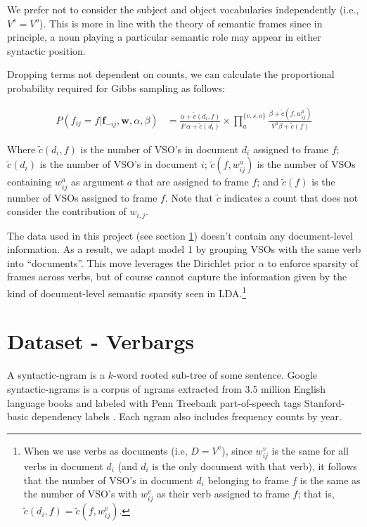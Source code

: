 \documentclass{article} %
\begin{document}
We prefer not to consider the subject and object vocabularies independently 
(i.e., $V^s = V^o$). This is more in line with the theory of semantic frames 
since in principle, a noun playing a particular semantic role may appear in either 
syntactic position.

Dropping terms not dependent on counts, we can calculate the proportional
probability required for Gibbs sampling as follows:

\begin{align}
P(f_{ij} = f|\mathbf{f}_{-ij},\mathbf{w}, \alpha,\beta)
&=\frac{\alpha + \tilde c(d_i,f)}{F\,\alpha + \tilde c(d_i)}
\times \prod_a^{\{v,s,o\}}\frac{\beta+\tilde c(f,w_{ij}^a)}{V^a\beta+\tilde c(f)}
\end{align}

Where $\tilde c (d_i, f)$ is the number of VSO's in document $d_i$ assigned to frame $f$;
$\tilde c(d_i)$ is the number of VSO's in document $i$;
$\tilde c(f,w_{ij}^a)$ is the number of VSOs containing $w_{ij}^a$ as argument $a$ that are
assigned to frame $f$; and
$\tilde c(f)$ is the number of VSOs assigned to frame $f$.
Note that $\tilde c$ indicates a count that does not consider the contribution of 
$w_{i,j}$.

The data used in this project (see section \ref{data}) doesn't contain any document-level
information. As a result, we adapt model 1 by grouping VSOs with the same verb into ``documents''.
This move leverages the Dirichlet prior $\alpha$ to enforce sparsity of frames 
across verbs, but of course cannot capture the information given by the kind of
document-level semantic sparsity seen in LDA.\footnote{When we use verbs as
documents (i.e, $D = V^v$), since $w_{ij}^v$ is the same for all verbs in document $d_i$ 
(and $d_i$ is the only document with that verb), it follows that the number of VSO's in document 
$d_i$ belonging to frame $f$ is the same as the number of VSO's with $w_{ij}^v$ as their verb assigned to 
frame $f$; that is, $\tilde c(d_i, f) = \tilde c(f, w_{ij}^v)$.}

\section{Dataset - Verbargs}
\label{data}

A syntactic-ngram is a $k$-word rooted sub-tree of some sentence.
Google syntactic-ngrams is a corpus of ngrams extracted from 3.5 million English language 
books and labeled with Penn Treebank part-of-speech tags Stanford-basic dependency 
labels \citep{ngrams2013}.
Each ngram also includes frequency counts by year.
\end{document}
